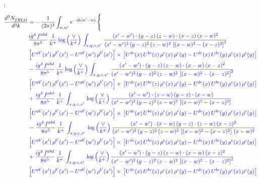 \documentclass[10pt]{article}
\numberwithin{equation}{section}
\newcommand{\new}[1]{{\color{blue}#1}}
\newcommand{\nc}{\color{blue}}
\begin{document}
\noindent \new{From \texttt{Other\_terms.tex}}:
\begin{align}
   \frac{d^{3}N_{2\,\rm NLO}^{\rm}}{d^{3}k}  & =  -\,\frac{1}{(2\pi)^{3}}  \int_{w, w^\prime} e^{-ik(w^\prime-w)}\, \Bigg\{\notag \\
& \nc   \frac{ig^{4}\, f^{abd}}{8\pi^{5}}\, \frac{1}{k^{+}}\,\new{\log{\left(\frac{\vee}{k^{+}}\right)}}\, \int_{x,y,z,x'}\,\frac{(x'-w')\cdot  (y-z)\, (z-w)\cdot (x-z)\, (x-w)^{2}}{(x'-w')^{2}\, (y-z)^{2}\, (z-w)^{2}\,\left[(x-w)^{2}-(x-z)^{2}\right]^{2}}\, \notag \\ & \nc  \left[U^{ab'}(x')\,\rho^{b'}(x')-U^{ab'}(w')\, \rho^{b'}(x')\right]\times\,\left[U^{de}(x)\,U^{bc}(z)\, \rho^{e}(x)\,\rho^{c}(y)-U^{de}(x)\,U^{bc}(y)\,\rho^{e}(x)\,\rho^{c}(y)\right] \notag \\
& \nc    - \frac{ig^{4}\, f^{abd}}{8\pi^{5}}\, \frac{1}{k^{+}}\,\new{\log{\left(\frac{\vee}{k^{+}}\right)}}\, \int_{x,y,z,x'}\,\frac{(x'-w')\cdot  (y-z)\, (z-w)\cdot (x-w)\, (x-z)^{2}}{(x'-w')^{2}\, (y-z)^{2}\, (z-w)^{2}\,\left[(x-w)^{2}-(x-z)^{2}\right]^{2}}\, \notag \\ & \nc  \left[U^{ab'}(x')\,\rho^{b'}(x')-U^{ab'}(w')\, \rho^{b'}(x')\right]\times\,\left[U^{de}(x)\,U^{bc}(z)\, \rho^{e}(x)\,\rho^{c}(y)-U^{de}(x)\,U^{bc}(y)\,\rho^{e}(x)\,\rho^{c}(y)\right] \notag \\
& \nc   + \frac{ig^{4}\, f^{abd}}{8\pi^{5}}\, \frac{1}{k^{+}}\, \int_{x,y,z,x'}\,\new{\log{\left(\frac{\vee}{k^{+}}\right)}}\,\frac{(x'-w')\cdot (z-w)\, (y-z)\cdot (x-w)}{(x'-w')^{2}\, (y-z)^{2}\, (z-w)^{2}\,\left[(x-w)^{2}-(x-z)^{2}\right]}\, \notag \\ & \nc  \left[U^{ab'}(x')\,\rho^{b'}(x')-U^{ab'}(w')\, \rho^{b'}(x')\right]\times\,\left[U^{de}(x)\,U^{bc}(z)\, \rho^{e}(x)\,\rho^{c}(y)-U^{de}(x)\,U^{bc}(y)\,\rho^{e}(x)\,\rho^{c}(y)\right] \notag \\
& \nc  -\,\frac{ig^{4}\, f^{abd}}{8\pi^{5}}\, \frac{1}{k^{+}}\, \int_{x,y,z,x'}\,\new{\log{\left(\frac{\vee}{k^{+}}\right)}}\,\frac{(x'-w')\cdot (x-w)\, (y-z)\cdot(z-w)\,(x-z)^{2}}{(x'-w')^{2}\, (y-z)^{2}\, (z-w)^{2}\,\left[(x-w)^{2}-(x-z)^{2}\right]\,(x-w)^{2}}\, \notag \\ & \nc  \left[U^{ab'}(x')\,\rho^{b'}(x')-U^{ab'}(w')\, \rho^{b'}(x')\right]\times\,\left[U^{de}(x)\,U^{bc}(z)\, \rho^{e}(x)\,\rho^{c}(y)-U^{de}(x)\,U^{bc}(y)\,\rho^{e}(x)\,\rho^{c}(y)\right] \notag \\
& \nc  +\frac{ig^{4}\, f^{abd}}{8\pi^{5}}\, \frac{1}{k^{+}}\, \int_{x,y,z,x'}\,\new{\log{\left(\frac{\vee}{k^{+}}\right)}}\,\frac{(x'-w')\cdot  (y-z)\, (z-w)\cdot (x-w)\, (x-z)^{2}}{(x'-w')^{2}\, (y-z)^{2}\, (z-w)^{2}\,\left[(x-w)^{2}-(x-z)^{2}\right]^{2}}\, \notag \\ & \nc  \left[U^{ab'}(x')\,\rho^{b'}(x')-U^{ab'}(w')\, \rho^{b'}(x')\right]\times\,\left[U^{de}(x)\,U^{bc}(z)\, \rho^{e}(x)\,\rho^{c}(y)-U^{de}(x)\,U^{bc}(y)\,\rho^{e}(x)\,\rho^{c}(y)\right] \notag \\

\end{align}
\end{document}
